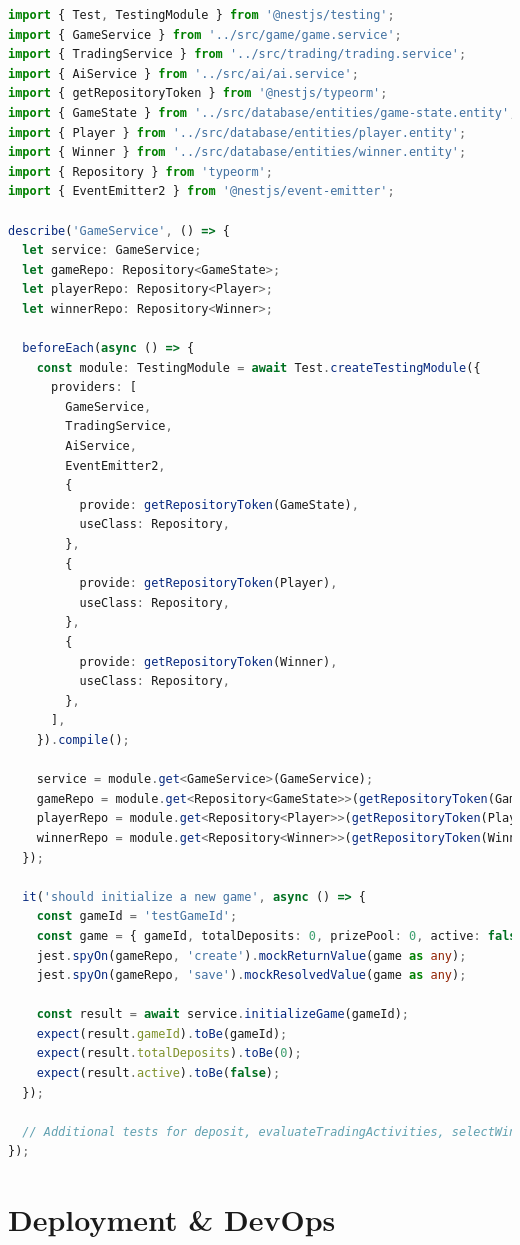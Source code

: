 \documentclass[11pt,a4paper]{article}
\begin{document}
\begin{lstlisting}[language=TypeScript, caption={Backend Service Test}]
import { Test, TestingModule } from '@nestjs/testing';
import { GameService } from '../src/game/game.service';
import { TradingService } from '../src/trading/trading.service';
import { AiService } from '../src/ai/ai.service';
import { getRepositoryToken } from '@nestjs/typeorm';
import { GameState } from '../src/database/entities/game-state.entity';
import { Player } from '../src/database/entities/player.entity';
import { Winner } from '../src/database/entities/winner.entity';
import { Repository } from 'typeorm';
import { EventEmitter2 } from '@nestjs/event-emitter';

describe('GameService', () => {
  let service: GameService;
  let gameRepo: Repository<GameState>;
  let playerRepo: Repository<Player>;
  let winnerRepo: Repository<Winner>;

  beforeEach(async () => {
    const module: TestingModule = await Test.createTestingModule({
      providers: [
        GameService,
        TradingService,
        AiService,
        EventEmitter2,
        {
          provide: getRepositoryToken(GameState),
          useClass: Repository,
        },
        {
          provide: getRepositoryToken(Player),
          useClass: Repository,
        },
        {
          provide: getRepositoryToken(Winner),
          useClass: Repository,
        },
      ],
    }).compile();

    service = module.get<GameService>(GameService);
    gameRepo = module.get<Repository<GameState>>(getRepositoryToken(GameState));
    playerRepo = module.get<Repository<Player>>(getRepositoryToken(Player));
    winnerRepo = module.get<Repository<Winner>>(getRepositoryToken(Winner));
  });

  it('should initialize a new game', async () => {
    const gameId = 'testGameId';
    const game = { gameId, totalDeposits: 0, prizePool: 0, active: false };
    jest.spyOn(gameRepo, 'create').mockReturnValue(game as any);
    jest.spyOn(gameRepo, 'save').mockResolvedValue(game as any);

    const result = await service.initializeGame(gameId);
    expect(result.gameId).toBe(gameId);
    expect(result.totalDeposits).toBe(0);
    expect(result.active).toBe(false);
  });

  // Additional tests for deposit, evaluateTradingActivities, selectWinners, resetGame
});
\end{lstlisting}

\section{Deployment \& DevOps}
\end{document}
